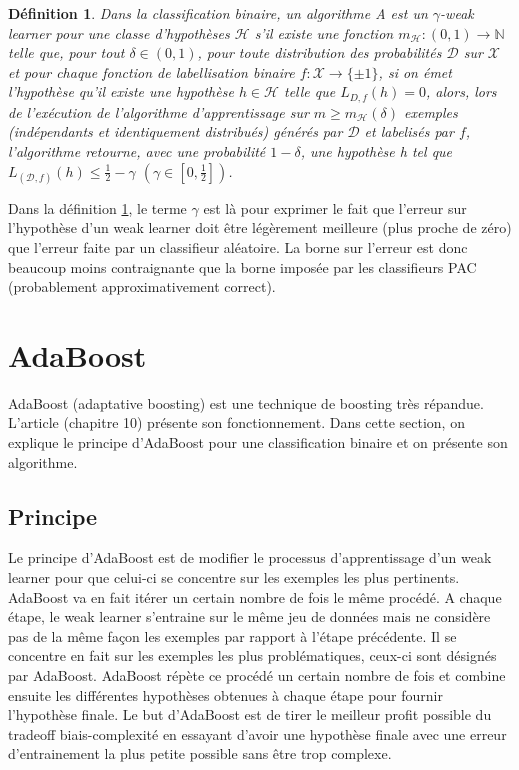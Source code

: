 \documentclass[12pt]{article}
\newtheorem{definition}{Définition}
\begin{document}
	\begin{definition} Dans la classification binaire, un algorithme \textit{A} est un $\gamma$-weak learner pour une classe d'hypothèses $\mathcal{H}$ s'il existe une fonction $m_{\mathcal{H}}: (0,1) \rightarrow
		\mathbb{N}$ telle que, pour tout $\delta \in (0,1)$, pour toute distribution des probabilités
		$\mathcal{D}$ sur $\mathcal{X}$ et pour chaque fonction de labellisation binaire $f:\mathcal{X}
		\rightarrow \{\pm 1\}$, si on émet l'hypothèse qu'il existe une hypothèse $h \in \mathcal H$
		telle que $L_{D,f}(h)=0$, alors, lors de l'exécution de l'algorithme d'apprentissage sur
		$m \geq m_{\mathcal{H}}(\delta)$ exemples (indépendants et identiquement distribués) générés
		par $\mathcal{D}$ et labelisés par $f$, l'algorithme retourne, avec une probabilité
		$1- \delta$, une hypothèse \textit{h} tel que $L_{(\mathcal{D}, f)}(h) \leq \frac{1}{2} - \gamma$ $(\gamma \in [0,\frac{1}{2}])$.
		\label{def:weaklearner}
	\end{definition}
	
	Dans la définition \ref{def:weaklearner}, le terme $\gamma$ est là pour exprimer le fait que l'erreur sur l'hypothèse d'un weak learner doit être légèrement meilleure (plus proche de zéro) que l'erreur faite par un classifieur aléatoire. La borne sur l'erreur est donc beaucoup moins contraignante que la borne imposée par les classifieurs PAC (probablement approximativement correct).
	
	\renewcommand{\labelitemi}{$\bullet$}
	\section{AdaBoost}
	
	AdaBoost (adaptative boosting) est une technique de boosting très répandue. L'article \cite{Bousquet2003-oz} (chapitre 10) présente son fonctionnement. Dans cette section, on explique le principe d'AdaBoost pour une classification binaire et on présente son algorithme.  
	
	\subsection{Principe}
	
	Le principe d'AdaBoost est de modifier le processus d'apprentissage d'un weak learner pour que celui-ci se concentre sur les exemples les plus pertinents. AdaBoost va en fait itérer un certain nombre de fois le même procédé. A chaque étape, le weak learner s'entraine sur le même jeu de données mais ne considère pas de la même façon les exemples par rapport à l'étape précédente. Il se concentre en fait sur les exemples les plus problématiques, ceux-ci sont désignés par AdaBoost. AdaBoost répète ce procédé un certain nombre de fois et combine ensuite les différentes hypothèses obtenues à chaque étape pour fournir l'hypothèse finale. Le but d'AdaBoost est de tirer le meilleur profit possible du tradeoff biais-complexité en essayant d'avoir une hypothèse finale avec une erreur d'entrainement la plus petite possible sans être trop complexe.
	
\end{document}
